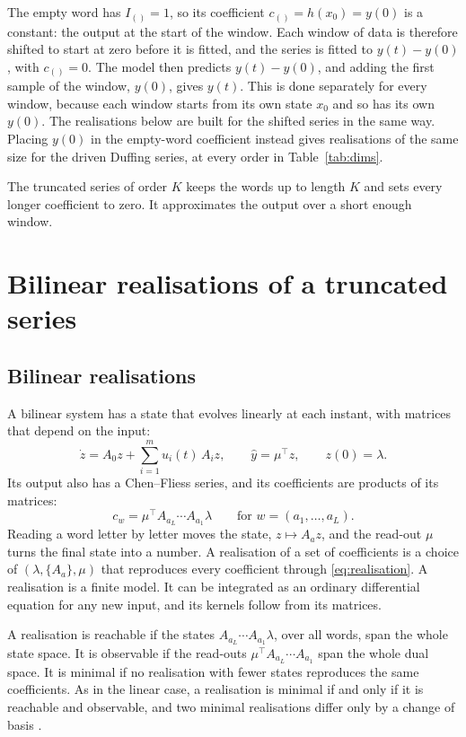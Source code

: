 \documentclass[11pt,a4paper]{article}
\theoremstyle{remark}
\begin{document}
The empty word has $I_{()}=1$, so its coefficient $c_{()}=h(x_0)=y(0)$ is a constant: the output at the start of the window.
Each window of data is therefore shifted to start at zero before it is fitted, and the series is fitted to $y(t)-y(0)$, with $c_{()}=0$.
The model then predicts $y(t)-y(0)$, and adding the first sample of the window, $y(0)$, gives $y(t)$.
This is done separately for every window, because each window starts from its own state $x_0$ and so has its own $y(0)$.
The realisations below are built for the shifted series in the same way.
Placing $y(0)$ in the empty-word coefficient instead gives realisations of the same size for the driven Duffing series, at every order in Table~\ref{tab:dims}.

The truncated series of order $K$ keeps the words up to length $K$ and sets every longer coefficient to zero.
It approximates the output over a short enough window.

\section{Bilinear realisations of a truncated series}\label{sec:realisation}
\subsection{Bilinear realisations}
A bilinear system has a state that evolves linearly at each instant, with matrices that depend on the input:
\begin{equation}\label{eq:bilinear}
\dot z=A_0z+\sum_{i=1}^mu_i(t)\,A_iz,\qquad \hat y=\mu^\top z,\qquad z(0)=\lambda .
\end{equation}
Its output also has a Chen--Fliess series, and its coefficients are products of its matrices:
\begin{equation}\label{eq:realisation}
c_w=\mu^\top A_{a_L}\cdots A_{a_1}\lambda\qquad\text{for } w=(a_1,\dots,a_L).
\end{equation}
Reading a word letter by letter moves the state, $z\mapsto A_az$, and the read-out $\mu$ turns the final state into a number.
A realisation of a set of coefficients is a choice of $(\lambda,\{A_a\},\mu)$ that reproduces every coefficient through \eqref{eq:realisation}.
A realisation is a finite model.
It can be integrated as an ordinary differential equation for any new input, and its kernels follow from its matrices.

A realisation is reachable if the states $A_{a_L}\cdots A_{a_1}\lambda$, over all words, span the whole state space.
It is observable if the read-outs $\mu^\top A_{a_L}\cdots A_{a_1}$ span the whole dual space.
It is minimal if no realisation with fewer states reproduces the same coefficients.
As in the linear case, a realisation is minimal if and only if it is reachable and observable, and two minimal realisations differ only by a change of basis \cite{DAlessandroIsidoriRuberti1974,BerstelReutenauer2011}.
\end{document}
